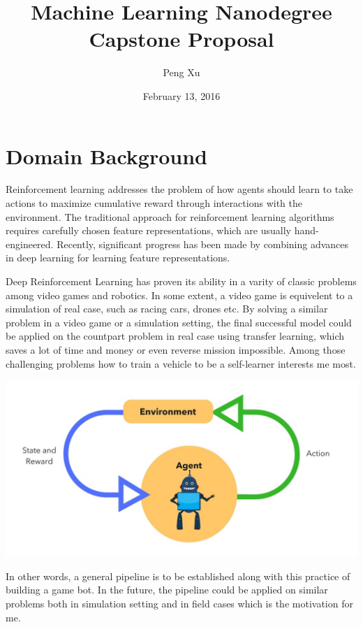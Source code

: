 \documentclass{article}
\title{Machine Learning Nanodegree \\ Capstone Proposal}
\author{Peng Xu}
\date{February 13, 2016}
\begin{document}
\maketitle

\section{Domain Background}

Reinforcement learning addresses the problem of how agents should learn to take actions to maximize cumulative reward through interactions with the environment. The traditional approach for reinforcement learning algorithms requires carefully chosen feature representations, which are usually hand-engineered. Recently, significant progress has been made by combining advances in deep learning for learning feature representations.

Deep Reinforcement Learning has proven its ability in a varity of classic problems among video games and robotics. In some extent, a video game is equivelent to a simulation of real case, such as racing cars, drones etc. By solving a similar problem in a video game or a simulation setting, the final successful model could be applied on the countpart problem in real case using transfer learning, which saves a lot of time and money or even reverse mission impossible. Among those challenging problems how to train a vehicle to be a self-learner interests me most.

\includegraphics[width=\textwidth]{interaction-flow}

In other words, a general pipeline is to be established along with this practice of building a game bot. In the future, the pipeline could be applied on similar problems both in simulation setting and in field cases which is the motivation for me.
\end{document}
